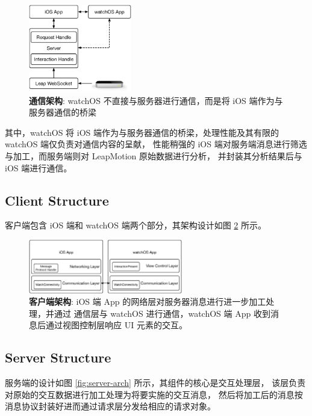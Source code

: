 \begin{figure}[H]
    \kaishu
    \centering
    \includegraphics[width=0.4\textwidth]{figures/arch}
    \caption{\kaishu \textbf{通信架构}: watchOS 不直接与服务器进行通信，而是将 iOS 端作为与服务器通信的桥梁}
    \label{fig:im-arch}
\end{figure}

其中，watchOS 将 iOS 端作为与服务器通信的桥梁，处理性能及其有限的 watchOS 端仅负责对通信内容的呈献，
性能稍强的 iOS 端对服务端消息进行筛选与加工，而服务端则对 LeapMotion 原始数据进行分析，
并封装其分析结果后与 iOS 端进行通信。

\subsection{Client Structure}

客户端包含 iOS 端和 watchOS 端两个部分，其架构设计如图 \ref{fig:client-arch} 所示。

\begin{figure}[H]
    \kaishu
    \centering
    \includegraphics[width=0.6\textwidth]{figures/client-arch}
    \caption{\kaishu \textbf{客户端架构}: iOS 端 App 的网络层对服务器消息进行进一步加工处理，并通过 通信层与 watchOS 进行通信，watchOS 端 App 收到消息后通过视图控制层响应 UI 元素的交互。}
    \label{fig:client-arch}
\end{figure}

\subsection{Server Structure}

服务端的设计如图 \ref{fig:server-arch} 所示，其组件的核心是交互处理层，
该层负责对原始的交互数据进行加工处理为将要实施的交互消息，
然后将加工后的消息按消息协议封装好进而通过请求层分发给相应的请求对象。

